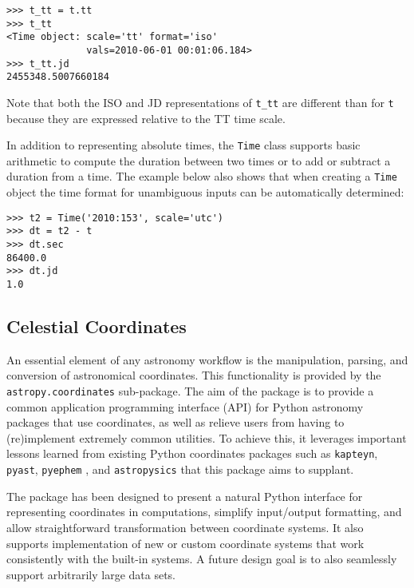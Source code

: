 \documentclass[traditabstract]{aa}
\begin{document}
\begin{verbatim}
>>> t_tt = t.tt
>>> t_tt
<Time object: scale='tt' format='iso'
              vals=2010-06-01 00:01:06.184>
>>> t_tt.jd
2455348.5007660184
\end{verbatim}

Note that both the ISO and JD representations of \verb|t_tt| are different
than for \verb|t| because they are expressed relative to the TT time scale.

In addition to representing absolute times, the \verb|Time| class supports
basic arithmetic to compute the duration between two times or to add or
subtract a duration from a time. The example below also shows that when
creating a \verb|Time| object the time format for unambiguous inputs can be
automatically determined:

\begin{verbatim}
>>> t2 = Time('2010:153', scale='utc')
>>> dt = t2 - t
>>> dt.sec
86400.0
>>> dt.jd
1.0
\end{verbatim}

\subsection{Celestial Coordinates}



An essential element of any astronomy workflow is the manipulation, parsing,
and conversion of astronomical coordinates. This functionality is provided by
the \texttt{astropy.coordinates} sub-package. The aim of the package is to
provide a common application programming interface (API) for Python astronomy
packages that use coordinates, as well as relieve users from having to
(re)implement extremely common utilities. To achieve this, it leverages
important lessons learned from existing Python coordinates packages such as
\texttt{kapteyn}, \texttt{pyast}, \texttt{pyephem} \citep{pyephem}, and
\texttt{astropysics} \citep{astropysics} that this package aims to supplant.

The package has been designed to present a natural Python interface for
representing coordinates in computations, simplify input/output formatting,
and allow straightforward transformation between coordinate systems. It also
supports implementation of new or custom coordinate systems that work
consistently with the built-in systems. A future design goal is to also
seamlessly support arbitrarily large data sets.
\end{document}
